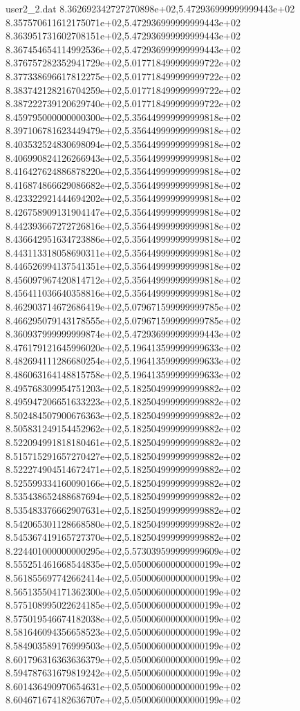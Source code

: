 \begin{filecontents}{user2_2.dat}
8.362692342727270898e+02,5.472936999999999443e+02
8.357570611612175071e+02,5.472936999999999443e+02
8.363951731602708151e+02,5.472936999999999443e+02
8.367454654114992536e+02,5.472936999999999443e+02
8.376757282352941729e+02,5.017718499999999722e+02
8.377338696617812275e+02,5.017718499999999722e+02
8.383742128216704259e+02,5.017718499999999722e+02
8.387222739120629740e+02,5.017718499999999722e+02
8.459795000000000300e+02,5.356449999999999818e+02
8.397106781623449479e+02,5.356449999999999818e+02
8.403532524830698094e+02,5.356449999999999818e+02
8.406990824126266943e+02,5.356449999999999818e+02
8.416427624886878220e+02,5.356449999999999818e+02
8.416874866629086682e+02,5.356449999999999818e+02
8.423322921444694202e+02,5.356449999999999818e+02
8.426758909131904147e+02,5.356449999999999818e+02
8.442393667272726816e+02,5.356449999999999818e+02
8.436642951634723886e+02,5.356449999999999818e+02
8.443113318058690311e+02,5.356449999999999818e+02
8.446526994137541351e+02,5.356449999999999818e+02
8.456097967420814712e+02,5.356449999999999818e+02
8.456411036640358816e+02,5.356449999999999818e+02
8.462903714672686419e+02,5.079671599999999785e+02
8.466295079143178555e+02,5.079671599999999785e+02
8.360937999999999874e+02,5.472936999999999443e+02
8.476179121645996020e+02,5.196413599999999633e+02
8.482694111286680254e+02,5.196413599999999633e+02
8.486063164148815758e+02,5.196413599999999633e+02
8.495768309954751203e+02,5.182504999999999882e+02
8.495947206651633223e+02,5.182504999999999882e+02
8.502484507900676363e+02,5.182504999999999882e+02
8.505831249154452962e+02,5.182504999999999882e+02
8.522094991818180461e+02,5.182504999999999882e+02
8.515715291657270427e+02,5.182504999999999882e+02
8.522274904514672471e+02,5.182504999999999882e+02
8.525599334160090166e+02,5.182504999999999882e+02
8.535438652488687694e+02,5.182504999999999882e+02
8.535483376662907631e+02,5.182504999999999882e+02
8.542065301128668580e+02,5.182504999999999882e+02
8.545367419165727370e+02,5.182504999999999882e+02
8.224401000000000295e+02,5.573039599999999609e+02
8.555251461668544835e+02,5.050006000000000199e+02
8.561855697742662414e+02,5.050006000000000199e+02
8.565135504171362300e+02,5.050006000000000199e+02
8.575108995022624185e+02,5.050006000000000199e+02
8.575019546674182038e+02,5.050006000000000199e+02
8.581646094356658523e+02,5.050006000000000199e+02
8.584903589176999503e+02,5.050006000000000199e+02
8.601796316363636379e+02,5.050006000000000199e+02
8.594787631679819242e+02,5.050006000000000199e+02
8.601436490970654631e+02,5.050006000000000199e+02
8.604671674182636707e+02,5.050006000000000199e+02

\end{filecontents}
